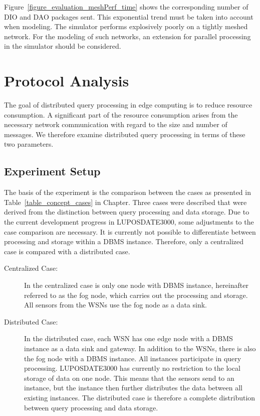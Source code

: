 \documentclass[english,version-2019-11]{uzl-thesis}
\begin{document}
Figure~\ref{figure_evaluation_meshPerf_time} shows the corresponding number of DIO and DAO packages sent. This exponential trend must be taken into account when modeling. The simulator performs explosively poorly on a tightly meshed network. For the modeling of such networks, an extension for parallel processing in the simulator should be considered.



\section{Protocol Analysis}
The goal of distributed query processing in edge computing is to reduce resource consumption. A significant part of the resource consumption arises from the necessary network communication with regard to the size and number of messages. We therefore examine distributed query processing in terms of these two parameters.
\subsection{Experiment Setup}
The basis of the experiment is the comparison between the cases as presented in Table~\ref{table_concept_cases} in Chapter\label{chapter_Concept}. Three cases were described that were derived from the distinction between query processing and data storage.
Due to the current development progress in LUPOSDATE3000, some adjustments to the case comparison are necessary. It is currently not possible to differentiate between processing and storage within a DBMS instance. Therefore, only a centralized case is compared with a distributed case.
\begin{description}
 \item [Centralized Case:]In the centralized case is only one node with DBMS instance, hereinafter referred to as the fog node, which carries out the processing and storage. All sensors from the WSNs use the fog node as a data sink.
 \item[Distributed Case:]  In the distributed case, each WSN has one edge node with a DBMS instance as a data sink and gateway. In addition to the WSNs, there is also the fog node with a DBMS instance. All instances participate in query processing.
LUPOSDATE3000 has currently no restriction to the local storage of data on one node. This means that the sensors send to an instance, but the instance then further distributes the data between all existing instances. The distributed case is therefore a complete distribution between query processing and data storage.
\end{description}
\end{document}
